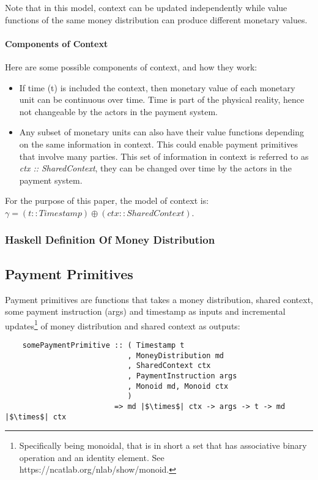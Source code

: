 Note that in this model, context can be updated independently while value functions of the same money distribution can
produce different monetary values.

\paragraph{Components of Context}

Here are some possible components of context, and how they work:

\begin{itemize}
\item If time (t) is included the context, then monetary value of each monetary unit can be continuous over time. Time
    is part of the physical reality, hence not changeable by the actors in the payment system.
\item Any subset of monetary units can also have their value functions depending on the same information in
    context. This could enable payment primitives that involve many parties. This set of information in context is
    referred to as \textit{ctx :: SharedContext}, they can be changed over time by the actors in the payment system.
\end{itemize}

For the purpose of this paper, the model of context is: $\gamma = (t :: Timestamp) \oplus (ctx :: SharedContext)$.

\subsubsection{Haskell Definition Of Money Distribution}




\subsection{Payment Primitives}

Payment primitives are functions that takes a money distribution, shared context, some payment instruction (args) and
timestamp as inputs and incremental updates\footnote{Specifically being monoidal, that is in short a set that has
associative binary operation and an identity element. See https://ncatlab.org/nlab/show/monoid. } of money
distribution and shared context as outputs:

\begin{verbatim}
    somePaymentPrimitive :: ( Timestamp t
                            , MoneyDistribution md
                            , SharedContext ctx
                            , PaymentInstruction args
                            , Monoid md, Monoid ctx
                            )
                         => md |$\times$| ctx -> args -> t -> md |$\times$| ctx
\end{verbatim}

